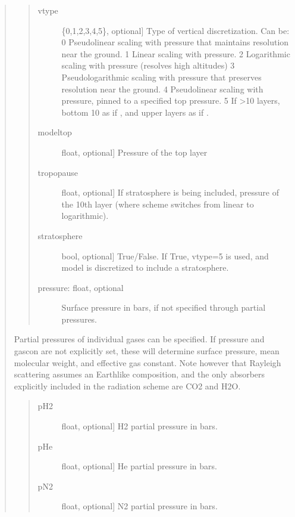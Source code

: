 \documentclass[letterpaper,10pt,english]{sphinxmanual}
\begin{document}
\begin{fulllineitems}
\begin{fulllineitems}
\begin{quote}
\begin{quote}
\begin{description}
\item[{vtype}] \leavevmode{[}\{0,1,2,3,4,5\}, optional{]}
Type of vertical discretization. Can be:
0   Pseudolinear scaling with pressure that maintains resolution near the ground.
1   Linear scaling with pressure.
2   Logarithmic scaling with pressure (resolves high altitudes)
3   Pseudologarithmic scaling with pressure that preserves resolution near the ground.
4   Pseudolinear scaling with pressure, pinned to a specified top pressure.
5   If \textgreater{}10 layers, bottom 10 as if , and upper layers as if .

\item[{modeltop}] \leavevmode{[}float, optional{]}
Pressure of the top layer

\item[{tropopause}] \leavevmode{[}float, optional{]}
If stratosphere is being included, pressure of the 10th layer (where scheme
switches from linear to logarithmic).

\item[{stratosphere}] \leavevmode{[}bool, optional{]}
True/False. If True, vtype=5 is used, and model is discretized to include
a stratosphere.

\item[{pressure: float, optional}] \leavevmode
Surface pressure in bars, if not specified through partial pressures.

\end{description}
\end{quote}


Partial pressures of individual gases can be specified. If pressure and gascon are not explicitly set, these will determine surface pressure, mean molecular weight, and effective gas constant. Note however that Rayleigh scattering assumes an Earth\sphinxhyphen{}like composition, and the only absorbers explicitly included in the radiation scheme are CO2 and H2O.
\begin{quote}
\begin{description}
\item[{pH2}] \leavevmode{[}float, optional{]}
H2 partial pressure in bars.

\item[{pHe}] \leavevmode{[}float, optional{]}
He partial pressure in bars.

\item[{pN2}] \leavevmode{[}float, optional{]}
N2 partial pressure in bars.


\end{description}
\end{quote}
\end{quote}
\end{fulllineitems}
\end{fulllineitems}
\end{document}
